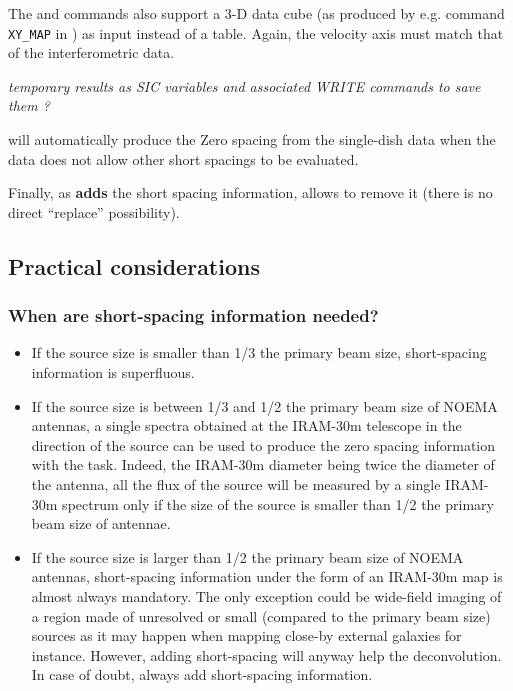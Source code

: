The  and  commands also support
a 3-D data cube (as produced by e.g. command \texttt{XY\_MAP} in \class{})
as input instead of a \class{} table. Again, the
velocity axis must match that of the interferometric data.

\emph{\color{red} temporary results as SIC variables and associated WRITE commands
to save them ?}

 will automatically produce the Zero spacing from
the single-dish data when the data does not allow other short spacings
to be evaluated.

Finally, as  \textbf{adds} the 
short spacing information,  allows to remove
it (there is no direct ``replace'' possibility).

\subsection{Practical considerations}

\subsubsection{When are short-spacing information needed?}

\begin{itemize}
\item If the source size is smaller than 1/3 the primary beam size,
  short-spacing information is superfluous.
\item If the source size is between 1/3 and 1/2 the primary beam size of
  NOEMA antennas, a single spectra obtained at the IRAM-30m telescope in
  the direction of the source can be used to produce the zero spacing
  information with the  task. Indeed, the IRAM-30m diameter
  being twice the diameter of the \PdBI{} antenna, all the flux of the
  source will be measured by a single IRAM-30m spectrum only if the size of
  the source is smaller than 1/2 the primary beam size of \PdBI{} antennae.
\item If the source size is larger than 1/2 the primary beam size of
  NOEMA antennas, short-spacing information under the form of an IRAM-30m
  map is almost always mandatory. The only exception could be wide-field
  imaging of a region made of unresolved or small (compared to the primary
  beam size) sources as it may happen when mapping close-by external
  galaxies for instance. However, adding short-spacing will anyway help the
  deconvolution. In case of doubt, always add short-spacing information.
\end{itemize}

